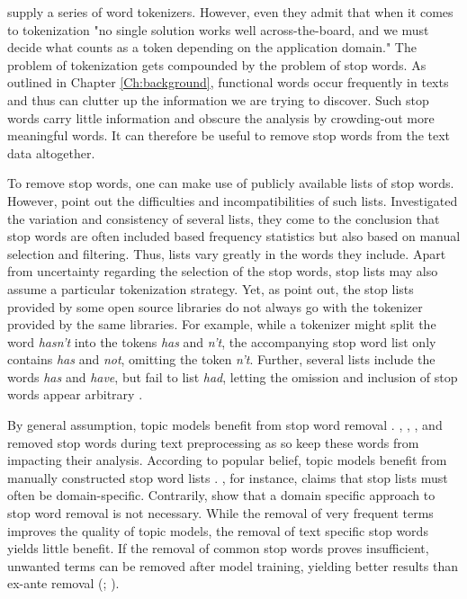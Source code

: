 \documentclass[11pt,a4paper,english,oneside]{book}
\numberwithin{equation}{chapter}
\begin{document}
\cite{Bird.2010} supply a series of word tokenizers. However, even they admit that when it comes to tokenization "no single solution works well across-the-board, and we must decide what counts as a token depending on the application domain." The problem of tokenization gets compounded by the problem of stop words. As outlined in Chapter \ref{Ch:background}, functional words occur frequently in texts and thus can clutter up the information we are trying to discover. Such stop words carry little information and obscure the analysis by crowding-out more meaningful words. It can therefore be useful to remove stop words from the text data altogether. 

To remove stop words, one can make use of publicly available lists of stop words. However, \citet{Nothman.2018} point out the difficulties and incompatibilities of such lists. Investigated the variation and consistency of several lists, they come to the conclusion that stop words are often included based frequency statistics but also based on manual selection and filtering. Thus, lists vary greatly in the words they include. Apart from uncertainty regarding the selection of the stop words, stop lists may also assume a particular tokenization strategy. Yet, as \citet{Nothman.2018} point out, the stop lists provided by some open source libraries do not always go with the tokenizer provided by the same libraries. For example, while a tokenizer might split the word \textit{hasn't} into the tokens \textit{has} and \textit{n't}, the accompanying stop word list only contains \textit{has} and \textit{not}, omitting the token \textit{n't}. Further, several lists include the words \textit{has} and \textit{have}, but fail to list \textit{had}, letting the omission and inclusion of stop words appear arbitrary \citep[p. 7--11]{Nothman.2018}.  

By general assumption, topic models benefit from stop word removal \cite[p. 432]{SchofieldA.MagnussonM.&MimnoD..2017}. \cite{Blei.2003}, \cite{Chem.2007}, \cite{Steyvers(2007)}, and \cite{Hofmann.2001} removed stop words during text preprocessing as so keep these words from impacting their analysis. According to popular belief, topic models benefit from manually constructed stop word lists \cite[p. 432]{SchofieldA.MagnussonM.&MimnoD..2017}. \citet[p. 7]{Darling.2011}, for instance, claims that stop lists must often be domain-specific. Contrarily, \cite{SchofieldA.MagnussonM.&MimnoD..2017} show that a domain specific approach to stop word removal is not necessary. While the removal of very frequent terms improves the quality of topic models, the removal of text specific stop words yields little benefit. If the removal of common stop words proves insufficient, unwanted terms can be removed after model training, yielding better results than ex-ante removal (\citealt[p. 432]{SchofieldA.MagnussonM.&MimnoD..2017}; \citealt{Schofield.2017}).
\end{document}
